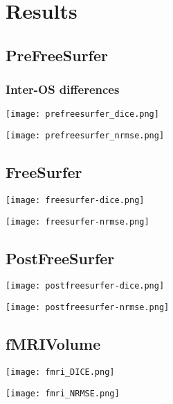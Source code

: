 \chapter{Results}

\section{PreFreeSurfer}

\subsection{Inter-OS differences}
\begin{center}
  \texttt{[image: prefreesurfer\_dice.png]}
   \label{fig:Prefreesurfer_Dice}
\end{center}

\begin{center}
  \texttt{[image: prefreesurfer\_nrmse.png]}
   \label{fig:Prefreesurfer_NRMSE}
\end{center}

\section{FreeSurfer}
\begin{center}
  \texttt{[image: freesurfer-dice.png]}
   \label{fig:Freesurfer_Dice}
\end{center}

\begin{center}
  \texttt{[image: freesurfer-nrmse.png]}
   \label{fig:Freesurfer_NRMSE}
\end{center}

\section{PostFreeSurfer}
\begin{center}
  \texttt{[image: postfreesurfer-dice.png]}
   \label{fig:Postfreesurfer_Dice}
\end{center}

\begin{center}
  \texttt{[image: postfreesurfer-nrmse.png]}
   \label{fig:Postfreesurfer_NRMSE}
\end{center}

\section{fMRIVolume}
\begin{center}
  \texttt{[image: fmri\_DICE.png]}
   \label{fig:fMRI_Dice}
\end{center}

\begin{center}
  \texttt{[image: fmri\_NRMSE.png]}
   \label{fig:fMRI_NRMSE}
\end{center}
